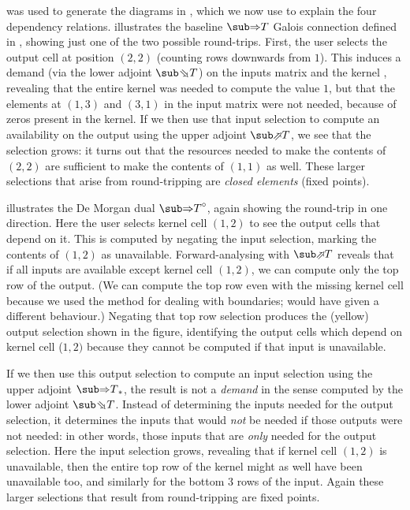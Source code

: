 \OurLanguage{} was used to generate the diagrams in , which we now use to explain the four dependency relations.  illustrates the baseline $\evalGC{T}$ Galois connection defined in , showing just one of the two possible round-trips. First, the user selects the output cell at position $(2,2)$ (counting rows downwards from $1$). This induces a demand (via the lower adjoint $\evalBwdF{T}$) on the inputs matrix  and the kernel , revealing that the entire kernel was needed to compute the value $1$, but that the elements at $(1,3)$ and $(3,1)$ in the input matrix were not needed, because of zeros present in the kernel. If we then use that input selection to  compute an availability on the output using the upper adjoint $\evalFwdF{T}$, we see that the selection grows: it turns out that the resources needed to make the contents of $(2,2)$ are sufficient to make the contents of $(1,1)$ as well. These larger selections that arise from round-tripping are \emph{closed elements} (fixed points).

 illustrates the De Morgan dual $\dual{\evalGC{T}}$, again showing the round-trip in one direction. Here the user selects kernel cell $(1, 2)$ to see the output cells that depend on it. This is computed by negating the input selection, marking the contents of $(1, 2)$ as unavailable. Forward-analysing with $\evalFwdF{T}$ reveals that if all inputs are available except kernel cell $(1, 2)$, we can compute only the top row of the output. (We can compute the top row even with the missing kernel cell because we used the method  for dealing with boundaries;  would have given a different behaviour.) Negating that top row selection produces the (yellow) output selection shown in the figure, identifying the output cells which depend on kernel cell ($1, 2)$ because they cannot be computed if that input is unavailable.

If we then use this output selection to compute an input selection using the upper adjoint $\upperAdj{\evalGC{T}}$, the result is not a \emph{demand} in the sense computed by the lower adjoint $\evalBwdF{T}$. Instead of determining the inputs needed for the output selection, it determines the inputs that would \emph{not} be needed if those outputs were not needed: in other words, those inputs that are \emph{only} needed for the output selection. Here the input selection grows, revealing that if kernel cell $(1, 2)$ is unavailable, then the entire top row of the kernel might as well have been unavailable too, and similarly for the bottom 3 rows of the input. Again these larger selections that result from round-tripping are fixed points.

